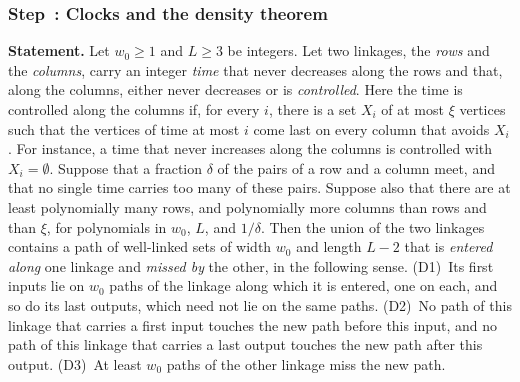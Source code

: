 \documentclass[fontsize=12pt,leading=14pt]{fullpaper}
\newcounter{step}
\renewcommand{\thestep}{\arabic{step}}
\newcommand{\step}[2]{%
\subsubsection*{\refstepcounter{step}\label{step:#1}Step~\thestep: #2}}
\newcommand{\stmt}[1]{\par\noindent\textbf{Statement.} #1\par\smallskip}
\begin{document}
\step{density}{Clocks and the density theorem}
\stmt{Let $w_0\ge1$ and $L\ge3$ be integers.
  Let two linkages, the \emph{rows} and the \emph{columns}, carry an integer \emph{time} that never decreases along the rows and that, along the columns, either never decreases or is \emph{controlled}.
  Here the time is controlled along the columns if, for every $i$, there is a set $X_i$ of at most $\xi$ vertices such that the vertices of time at most $i$ come last on every column that avoids $X_i$.
  For instance, a time that never increases along the columns is controlled with $X_i=\emptyset$.
  Suppose that a fraction $\delta$ of the pairs of a row and a column meet, and that no single time carries too many of these pairs.
  Suppose also that there are at least polynomially many rows, and polynomially more columns than rows and than $\xi$, for polynomials in $w_0$, $L$, and $1/\delta$.
  Then the union of the two linkages contains a path of well-linked sets of width $w_0$ and length $L-2$ that is \emph{entered along} one linkage and \emph{missed by} the other, in the following sense.
  (D1)~Its first inputs lie on $w_0$ paths of the linkage along which it is entered, one on each, and so do its last outputs, which need not lie on the same paths.
  (D2)~No path of this linkage that carries a first input touches the new path before this input, and no path of this linkage that carries a last output touches the new path after this output.
(D3)~At least $w_0$ paths of the other linkage miss the new path.}
\end{document}

